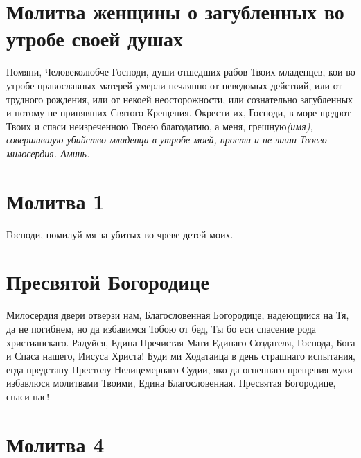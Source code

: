\section{Молитва женщины о загубленных во утробе своей душах}
 


Помяни, Человеколюбче Господи, души отшедших рабов Твоих младенцев, кои во утробе православных матерей умерли нечаянно от неведомых действий, или от трудного рождения, или от некоей неосторожности, или сознательно загубленных и потому не принявших Святого Крещения. Окрести их, Господи, в море щедрот Твоих и спаси неизреченною Твоею благодатию, а меня, грешную\itshape  (имя\normalfont{}), совершившую убийство младенца в утробе моей, прости и не лиши Твоего милосердия. Аминь.


\section{Молитва 1}
 
Господи, помилуй мя за убитых во чреве детей моих.

\section{Пресвятой Богородице}
 


Милосердия двери отверзи нам, Благословенная Богородице, надеющиися на Тя, да не погибнем, но да избавимся Тобою от бед, Ты бо еси спасение рода христианскаго. Радуйся, Едина Пречистая Мати Единаго Создателя, Господа, Бога и Спаса нашего, Иисуса Христа! Буди ми Ходатаица в день страшнаго испытания, егда предстану Престолу Нелицемернаго Судии, яко да огненнаго прещения муки избавлюся молитвами Твоими, Едина Благословенная. Пресвятая Богородице, спаси нас!


\section{Молитва 4}
 


